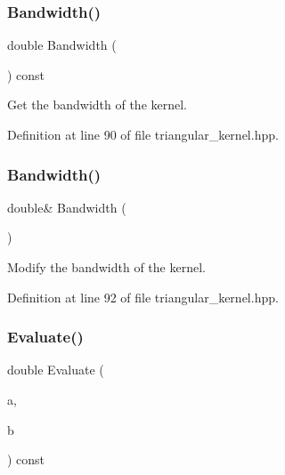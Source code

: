 \subsubsection{Bandwidth()\hspace{0.1cm}{\footnotesize\ttfamily [1/2]}}
{\footnotesize\ttfamily double Bandwidth (\begin{DoxyParamCaption}{ }\end{DoxyParamCaption}) const\hspace{0.3cm}{\ttfamily [inline]}}



Get the bandwidth of the kernel. 



Definition at line 90 of file triangular\+\_\+kernel.\+hpp.

\mbox{\label{classmlpack_1_1kernel_1_1TriangularKernel_a202e9a76b6f5f948e98e68a374ae8ea4}} 
\subsubsection{Bandwidth()\hspace{0.1cm}{\footnotesize\ttfamily [2/2]}}
{\footnotesize\ttfamily double\& Bandwidth (\begin{DoxyParamCaption}{ }\end{DoxyParamCaption})\hspace{0.3cm}{\ttfamily [inline]}}



Modify the bandwidth of the kernel. 



Definition at line 92 of file triangular\+\_\+kernel.\+hpp.

\mbox{\label{classmlpack_1_1kernel_1_1TriangularKernel_a84c3aeba25ea7703bd2d4f85a54301da}} 
\subsubsection{Evaluate()\hspace{0.1cm}{\footnotesize\ttfamily [1/2]}}
{\footnotesize\ttfamily double Evaluate (\begin{DoxyParamCaption}\item[{const Vec\+TypeA \&}]{a,  }\item[{const Vec\+TypeB \&}]{b }\end{DoxyParamCaption}) const\hspace{0.3cm}{\ttfamily [inline]}}



